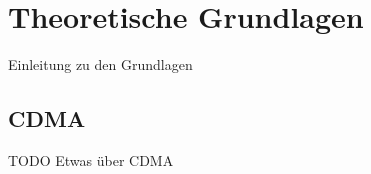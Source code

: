 \chapter{Theoretische Grundlagen}
Einleitung zu den Grundlagen



\section{CDMA}
TODO Etwas über CDMA


